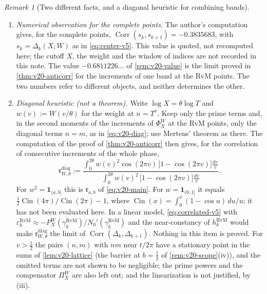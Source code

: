 \documentclass[11pt,a4paper]{article}
\numberwithin{equation}{section}
\theoremstyle{definition}
\theoremstyle{remark}
\newtheorem{remark}[theorem]{Remark}
\newcommand{\ind}{\mathbf 1}
\begin{document}
\begin{remark}[Two different facts, and a diagonal heuristic for combining bands]\label{rem:v21-two-facts}
\begin{enumerate}[label=(\roman*),leftmargin=*]
\item \emph{Numerical observation for the complete points.} The author's computation gives, for the complete points, $\operatorname{Corr}(s_k,s_{k+1})=-0.3835683$, with $s_k=\Delta_k(X;W)$ as in \eqref{eq:center-v5}. This value is quoted, not recomputed here; the cutoff $X$, the weight and the window of indices are not recorded in this note. The value $-0.6811226\ldots$ of \cref{rem:v20-value} is the limit proved in \cref{thm:v20-anticorr} for the increments of one band at the RvM points. The two numbers refer to different objects, and neither determines the other.
\item \emph{Diagonal heuristic (not a theorem).} Write $\log X=\theta\log T$ and $w(v):=W(v/\theta)$ for the weight at $n=T^v$. Keep only the prime terms and, in the second moments of the increments of $\Phi_X^W$ at the RvM points, only the diagonal terms $n=m$, as in \eqref{eq:v20-diag}; use Mertens' theorem as there. The computation of the proof of \cref{thm:v20-anticorr} then gives, for the correlation of consecutive increments of the whole phase,
\begin{equation}\label{eq:v21-diag}
 \mathfrak r^{\mathrm{diag}}_{W,\theta}:=\frac{\displaystyle\int_0^{2\theta}w(v)^2\cos(2\pi v)\,\bigl[1-\cos(2\pi v)\bigr]\frac{dv}v}
 {\displaystyle\int_0^{2\theta}w(v)^2\,\bigl[1-\cos(2\pi v)\bigr]\frac{dv}v}.
\end{equation}
For $w^2=\ind_{(a,b]}$ this is $\mathfrak r_{a,b}$ of \eqref{eq:v20-main}. For $w=\ind_{(0,1]}$ it equals $\tfrac12\operatorname{Cin}(4\pi)/\operatorname{Cin}(2\pi)-1$, where $\operatorname{Cin}(x)=\int_0^x(1-\cos u)\,du/u$; it has not been evaluated here. In a linear model, \eqref{eq:correlated-v5} with $\varepsilon_k^{\mathrm{RvM}}\approx-P_X^W(\gamma_k^{\mathrm{RvM}})/N_0'(\gamma_k^{\mathrm{RvM}})$ and the near-constancy of $h_k^{\mathrm{RvM}}$ would make $\mathfrak r^{\mathrm{diag}}_{W,\theta}$ the limit of $\operatorname{Corr}(\Delta_k,\Delta_{k+1})$. Nothing in this item is proved. For $v>\tfrac12$ the pairs $(n,m)$ with $nm$ near $t/2\pi$ have a stationary point in the sums of \cref{lem:v20-lattice} (the barrier at $b=\frac12$ of \cref{rem:v20-scope}(iv)), and the omitted terms are not shown to be negligible; the prime powers and the compensator $\Pi_X^W$ are also left out; and the linearization is not justified, by (iii).

\end{enumerate}
\end{remark}
\end{document}
